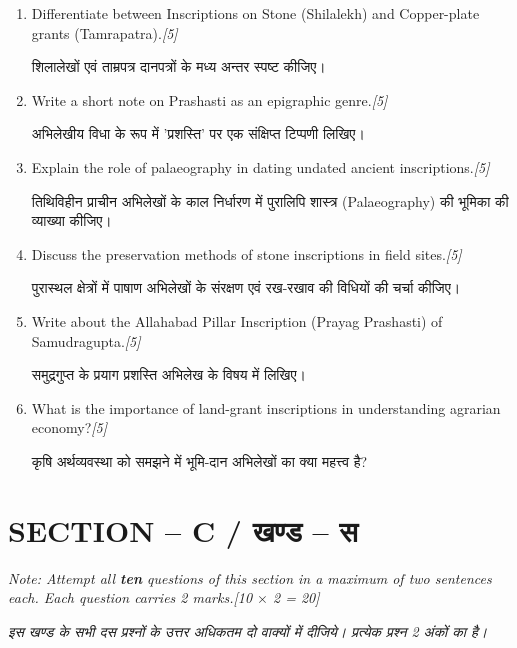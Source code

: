 \documentclass[11pt,a4paper]{article}
\newcommand{\pts}[1]{\hfill \textit{[#1]}}
\begin{document}
\begin{enumerate}[label=\textbf{\arabic*.},leftmargin=*,start=6,itemsep=10pt]

  \item Differentiate between Inscriptions on Stone (Shilalekh) and Copper-plate grants (Tamrapatra).\pts{5}
  
  शिलालेखों एवं ताम्रपत्र दानपत्रों के मध्य अन्तर स्पष्ट कीजिए।

  \item Write a short note on Prashasti as an epigraphic genre.\pts{5}
  
  अभिलेखीय विधा के रूप में 'प्रशस्ति' पर एक संक्षिप्त टिप्पणी लिखिए।

  \item Explain the role of palaeography in dating undated ancient inscriptions.\pts{5}
  
  तिथिविहीन प्राचीन अभिलेखों के काल निर्धारण में पुरालिपि शास्त्र (Palaeography) की भूमिका की व्याख्या कीजिए।

  \item Discuss the preservation methods of stone inscriptions in field sites.\pts{5}
  
  पुरास्थल क्षेत्रों में पाषाण अभिलेखों के संरक्षण एवं रख-रखाव की विधियों की चर्चा कीजिए।

  \item Write about the Allahabad Pillar Inscription (Prayag Prashasti) of Samudragupta.\pts{5}
  
  समुद्रगुप्त के प्रयाग प्रशस्ति अभिलेख के विषय में लिखिए।

  \item What is the importance of land-grant inscriptions in understanding agrarian economy?\pts{5}
  
  कृषि अर्थव्यवस्था को समझने में भूमि-दान अभिलेखों का क्या महत्त्व है?

\end{enumerate}

\bigskip

\section*{SECTION -- C / खण्ड -- स}
\noindent \textit{Note: Attempt all \textbf{ten} questions of this section in a maximum of two sentences each. Each question carries 2 marks.}\pts{10 $\times$ 2 = 20}

\noindent \textit{इस खण्ड के सभी दस प्रश्नों के उत्तर अधिकतम दो वाक्यों में दीजिये। प्रत्येक प्रश्न 2 अंकों का है।}
\end{document}
